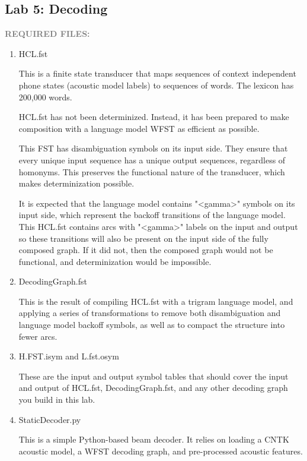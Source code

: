 {\subsection{Lab 5: Decoding}
\label{sub:lab-5}
{\bf \textcolor{gray}{REQUIRED FILES:}}
\begin{enumerate}
  \item  HCL.fst

    This is a finite state transducer that maps sequences of context independent phone states (acoustic model labels) to sequences of words. The lexicon has 200,000 words.

    HCL.fst has not been determinized. Instead, it has been prepared to make composition with a language model WFST as efficient as possible.

    This FST has disambiguation symbols on its input side. They ensure that every unique input sequence has a unique output sequences, regardless of homonyms. This preserves the functional nature of the transducer, which makes determinization possible.

    It is expected that the language model contains "<gamma>" symbols on its input side, which represent the backoff transitions of the language model. This HCL.fst contains arcs with "<gamma>" labels on the input and output so these transitions will also be present on the input side of the fully composed graph. If it did not, then the composed graph would not be functional, and determinization would be impossible.
  \item DecodingGraph.fst

    This is the result of compiling HCL.fst with a trigram language model, and applying a series of transformations to remove both disambiguation and language model backoff symbols, as well as to compact the structure into fewer arcs.

  \item H.FST.isym and L.fst.osym

    These are the input and output symbol tables that should cover the input and output of HCL.fst, DecodingGraph.fst, and any other decoding graph you build in this lab.
  \item StaticDecoder.py

    This is a simple Python-based beam decoder. It relies on loading a CNTK acoustic model, a WFST decoding graph, and pre-processed acoustic features.
\end{enumerate}

}
